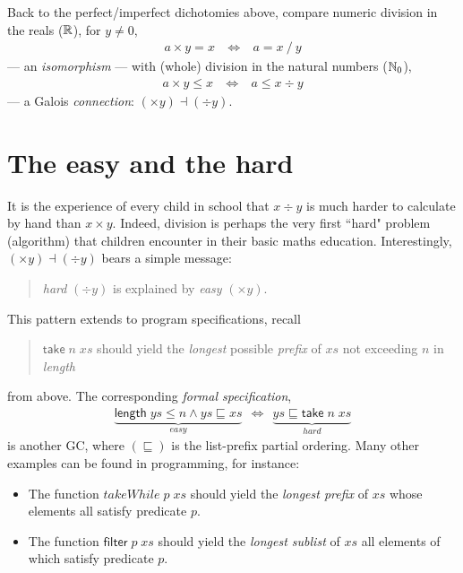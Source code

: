 \documentclass{elsarticle}
\newcommand{\Varid}[1]{\mathit{#1}}
\renewcommand{\leq}{\leqslant}
\def\N{\mathbb{N}\index{Números naturais ($I\!\!N$)}}
\def\R{\mathbb{R}\index{Números reais ($I\!\!R$)}}
\def\wider#1{~ #1 ~}
\def\equiv{\Leftrightarrow}
\begin{document}
Back to the perfect/imperfect dichotomies above, compare {numeric division} in the reals (\ensuremath{\R}), for \ensuremath{\Varid{y}\not=\mathrm{0}},
\begin{eqnarray*}
	\ensuremath{\Varid{a} \times \Varid{y}\mathrel{=}\Varid{x}} & \ensuremath{~\Leftrightarrow~} & \ensuremath{\Varid{a}\mathrel{=}\Varid{x}\mathbin{/}\Varid{y}}
\end{eqnarray*}
--- an \emph{isomorphism} --- with (whole) division in the natural numbers (\ensuremath{\N_0}),
\begin{eqnarray}
	\ensuremath{\Varid{a} \times \Varid{y}\leq \Varid{x}} & \ensuremath{~\Leftrightarrow~} & \ensuremath{\Varid{a}\leq {\Varid{x}}\div{\Varid{y}}}
	\label{eq:221026b}
\end{eqnarray}
--- a Galois \emph{connection}: \ensuremath{( \times \Varid{y})\mathbin\dashv (\div \Varid{y})}.

\section{The easy and the hard}
It is the experience of every child in school that \ensuremath{\Varid{x}\div \Varid{y}} is much harder to calculate by hand than \ensuremath{\Varid{x} \times \Varid{y}}.
Indeed, division is perhaps the very first ``hard" problem (algorithm) that children encounter in their basic maths education.
Interestingly, \ensuremath{( \times \Varid{y})\mathbin\dashv (\div \Varid{y})} bears a simple message:
\begin{quote}
\emph{hard} \ensuremath{(\div \Varid{y})} is explained by \emph{easy} \ensuremath{( \times \Varid{y})}.
\end{quote}
This pattern extends to program specifications, recall 
\begin{quote}
\ensuremath{\mathsf{take}\;\Varid{n}\;\Varid{xs}} should yield the \emph{longest} possible \emph{prefix} of \ensuremath{\Varid{xs}} not exceeding \ensuremath{\Varid{n}} in \emph{length}
\end{quote}
from above.
The corresponding \emph{formal specification},
\begin{eqnarray}
	\ensuremath{\underbrace{\mathsf{length}\;\Varid{ys}\leq \Varid{n}\mathrel{\wedge}\Varid{ys}\sqsubseteq \Varid{xs}}_{\Varid{easy}}} \wider{\wider\equiv} \ensuremath{\underbrace{\Varid{ys}\sqsubseteq \mathsf{take}\;\Varid{n}\;\Varid{xs}}_{\Varid{hard}}}
	\label{eq:220629a}
	\label{eq:100101a'}
\end{eqnarray}
is another GC, where \ensuremath{(\sqsubseteq )} is the list-prefix partial ordering. Many other examples can be found in programming, for
instance:
\begin{itemize}
\item	The function \ensuremath{\Varid{takeWhile}\;\Varid{p}\;\Varid{xs}} should yield the \emph{longest prefix} of \ensuremath{\Varid{xs}} whose elements all satisfy predicate \ensuremath{\Varid{p}}.
\item	The function \ensuremath{\mathsf{filter}\;\Varid{p}\;\Varid{xs}} should yield the \emph{longest sublist} of $ xs$ all elements of which satisfy predicate $ p$.
\end{itemize}
\end{document}
